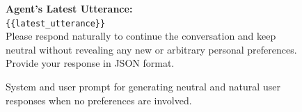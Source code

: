 \begin{figure}[t]
{\begin{tcolorbox}[colback=blue!5!white, colframe=blue!75!black, 
title=System and User Prompt for Natural Conversation Responses, boxrule=0.3mm, width=\textwidth, arc=3mm, auto outer arc=true]
\textbf{Agent's Latest Utterance:}\\
\texttt{\{\{latest\_utterance\}\}}\\[1mm]

Please respond naturally to continue the conversation and keep neutral without revealing any new or arbitrary personal preferences. Provide your response in JSON format.

\end{tcolorbox}
}
\caption{System and user prompt for generating neutral and natural user responses when no preferences are involved.}
\label{fig:response_natural_prompt}
\end{figure}




